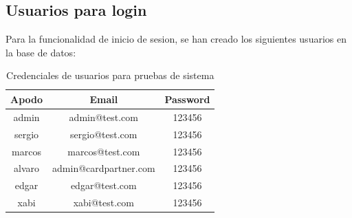 \documentclass[10pt]{article}
\begin{document}
			\subsection{Usuarios para login}
				Para la funcionalidad de inicio de sesion, se han creado los siguientes usuarios en la base de datos:
				
			\begin{table}[H]
				\centering
				
				\vspace{0.3cm} %
				\begin{tabular}{c c c} 
					\toprule
					\textbf{Apodo} & \textbf{Email} & \textbf{Password} \\
					\midrule
					admin  & admin@test.com        & 123456 \\
					sergio & sergio@test.com       & 123456 \\
					marcos & marcos@test.com       & 123456 \\
					alvaro & admin@cardpartner.com & 123456 \\
					edgar  & edgar@test.com        & 123456 \\
					xabi   & xabi@test.com         & 123456 \\
					\bottomrule
				\end{tabular}
				\caption{Credenciales de usuarios para pruebas de sistema}
				\label{tab:usuarios_prueba}
			\end{table}
	
\end{document}
